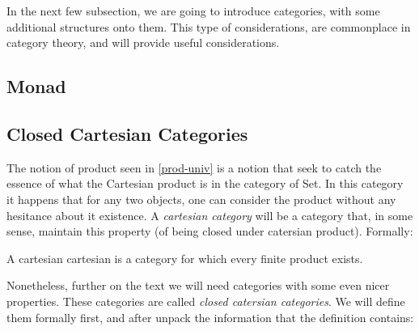   In the next few subsection, we are going to introduce categories, with some additional structures onto them. This type of considerations, are commonplace in category theory, and will provide useful considerations.

  \subsection{Monad}
  


  \subsection{Closed Cartesian Categories}

  The notion of product seen in \ref{prod-univ} is a notion that seek to catch the essence of what the Cartesian product is in the category of Set. In this category it happens that for any two objects, one can consider the product without any hesitance about it existence. A \emph{cartesian category} will be a category that, in some sense, maintain this property (of being closed under catersian product). Formally: 
  \begin{definition}
    A cartesian cartesian is a category for which every finite product exists.
  \end{definition}

Nonetheless, further on the text we will need categories with some even nicer properties. These categories are called \emph{closed catersian categories}. We will define them formally first, and after unpack the information that the definition contains:
  
